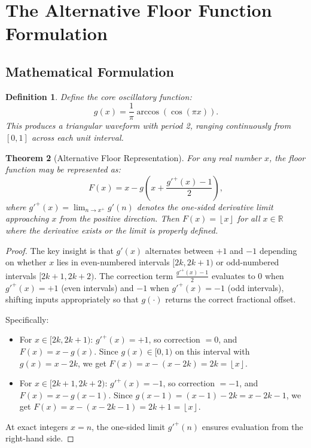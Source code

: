 \documentclass[12pt, a4paper]{article}
\theoremstyle{note}
\newtheorem{theorem}{Theorem}[section]
\newtheorem{definition}[theorem]{Definition}
\newcommand{\floor}[1]{\left\lfloor #1 \right\rfloor}
\newcommand{\Real}{\mathbb{R}}
\begin{document}
\section{The Alternative Floor Function Formulation}
\label{sec:floor}

\subsection{Mathematical Formulation}

\begin{definition}\label{def:g}
Define the core oscillatory function:
\[
g(x) = \frac{1}{\pi}\arccos\!\left(\cos\!\left(\pi x\right)\right).
\]
This produces a triangular waveform with period 2, ranging continuously from $[0,1]$ across each unit interval.
\end{definition}

\begin{theorem}[Alternative Floor Representation]\label{thm:floor}
For any real number $x$, the floor function may be represented as:
\[
F(x) = x - g\!\left(x + \frac{g'^{+}(x) - 1}{2}\right),
\]
where $g'^{+}(x) = \lim_{n \to x^+} g'(n)$ denotes the one-sided derivative limit approaching $x$ from the positive direction. Then $F(x) = \floor{x}$ for all $x \in \Real$ where the derivative exists or the limit is properly defined.
\end{theorem}

\begin{proof}
The key insight is that $g'(x)$ alternates between $+1$ and $-1$ depending on whether $x$ lies in even-numbered intervals $[2k, 2k+1)$ or odd-numbered intervals $[2k+1, 2k+2)$. The correction term $\frac{g'^{+}(x) - 1}{2}$ evaluates to $0$ when $g'^{+}(x) = +1$ (even intervals) and $-1$ when $g'^{+}(x) = -1$ (odd intervals), shifting inputs appropriately so that $g(\cdot)$ returns the correct fractional offset.

Specifically:
\begin{itemize}
    \item For $x \in [2k, 2k+1)$: $g'^{+}(x) = +1$, so correction $= 0$, and $F(x) = x - g(x)$. Since $g(x) \in [0,1)$ on this interval with $g(x) = x - 2k$, we get $F(x) = x - (x - 2k) = 2k = \floor{x}$.
    \item For $x \in [2k+1, 2k+2)$: $g'^{+}(x) = -1$, so correction $= -1$, and $F(x) = x - g(x - 1)$. Since $g(x-1) = (x - 1) - 2k = x - 2k - 1$, we get $F(x) = x - (x - 2k - 1) = 2k + 1 = \floor{x}$.
\end{itemize}

At exact integers $x = n$, the one-sided limit $g'^{+}(n)$ ensures evaluation from the right-hand side.
\end{proof}
\end{document}
